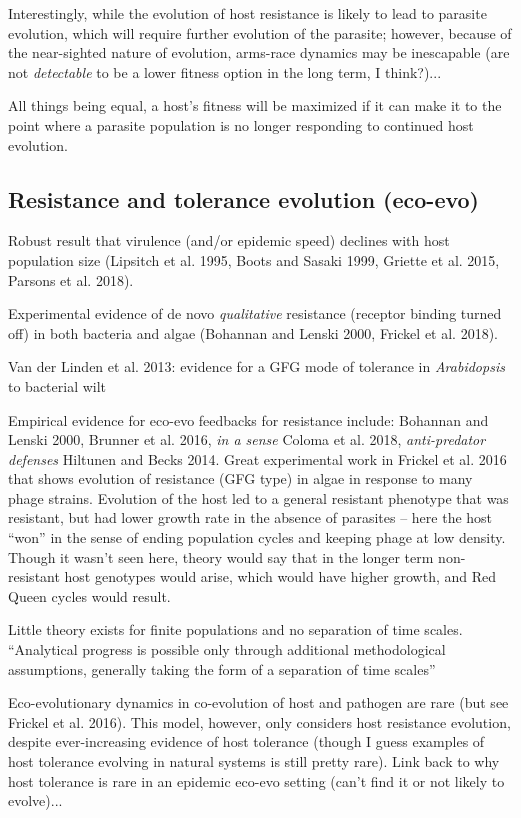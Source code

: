 \documentclass{article}
\begin{document}
Interestingly, while the evolution of host resistance is likely to lead to parasite evolution, which will require further evolution of the parasite; however, because of the near-sighted nature of evolution, arms-race dynamics may be inescapable (are not \emph{detectable} to be a lower fitness option in the long term, I think?)...

All things being equal, a host's fitness will be maximized if it can make it to the point where a parasite population is no longer responding to continued host evolution. 

\subsection*{Resistance and tolerance evolution (eco-evo)}

Robust result that virulence (and/or epidemic speed) declines with host population size (Lipsitch et al. 1995, Boots and Sasaki 1999, Griette et al. 2015, Parsons et al. 2018).

Experimental evidence of de novo \emph{qualitative} resistance (receptor binding turned off) in both bacteria and algae (Bohannan and Lenski 2000, Frickel et al. 2018).

Van der Linden et al. 2013: evidence for a GFG mode of tolerance in \emph{Arabidopsis} to bacterial wilt

Empirical evidence for eco-evo feedbacks for resistance include: Bohannan and Lenski 2000, Brunner et al. 2016, \emph{in a sense} Coloma et al. 2018, \emph{anti-predator defenses} Hiltunen and Becks 2014. Great experimental work in Frickel et al. 2016 that shows evolution of resistance (GFG type) in algae in response to many phage strains. Evolution of the host led to a general resistant phenotype that was resistant, but had lower growth rate in the absence of parasites -- here the host ``won'' in the sense of ending population cycles and keeping phage at low density. Though it wasn't seen here, theory would say that in the longer term non-resistant host genotypes would arise, which would have higher growth, and Red Queen cycles would result. 

Little theory exists for finite populations and no separation of time scales. ``Analytical progress is possible only through additional methodological assumptions, generally taking the form of a separation of time scales''

Eco-evolutionary dynamics in co-evolution of host and pathogen are rare (but see Frickel et al. 2016). This model, however, only considers host resistance evolution, despite ever-increasing evidence of host tolerance (though I guess examples of host tolerance evolving in natural systems is still pretty rare). Link back to why host tolerance is rare in an epidemic eco-evo setting (can't find it or not likely to evolve)... 
\end{document}
